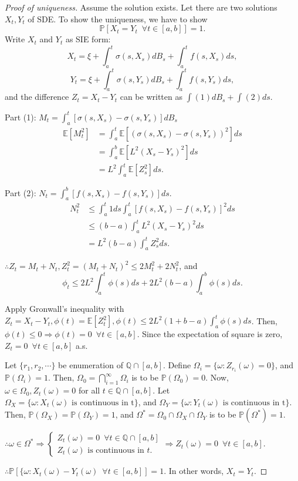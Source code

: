 \documentclass[12pt]{report}
\renewcommand{\P}{\mathbb{P}}
\newcommand{\E}{\mathbb{E}}
\renewcommand{\1}{\mathbb{1}}
\renewcommand{\O}{\Omega}
\theoremstyle{break}
\theoremstyle{newdef}
\theoremstyle{remark}
\begin{document}
\begin{proof}[Proof of uniqueness]
Assume the solution exists.
Let there are two solutions $X_t, Y_t$ of SDE.
To show the uniqueness, we have to show
$$
\P[X_t = Y_t \enspace \forall t\in[a,b]] = 1.
$$
Write $X_t$ and $Y_t$ as SIE form:
$$
X_t = \xi + \int_a^t \sigma(s,X_s)dB_s + \int_a^t f(s,X_s)ds,
$$
$$
Y_t = \xi + \int_a^t \sigma(s,Y_s)dB_s + \int_a^t f(s,Y_s)ds,
$$
and the difference $Z_t = X_t - Y_t$ can be written as $\int (1) dB_s + \int (2)ds$.


Part (1): $M_t = \int_a^t [\sigma(s,X_s) - \sigma(s,Y_s)]dB_s$
\begin{align}
\E[M_t^2] &= \int_a^t \E\left[(\sigma(s,X_s)-\sigma(s,Y_s))^2\right]ds\tag*{}\\
&= \int_a^b \E\left[ L^2(X_s-Y_s)^2 \right]ds\tag{By Lipschitz}\\
&= L^2\int_a^t \E\left[Z_s^2\right]ds.\tag*{}
\end{align}


Part (2): $N_t = \int_a^b \left[f(s,X_s)-f(s,Y_s)\right]ds$.
\begin{align}
N_t^2
&\leq \int_a^t 1ds \int_a^t \left[ f(s,X_s)-f(s,Y_s)\right]^2ds\tag*{}\\
&\leq (b-a) \int_a^t L^2(X_s-Y_s)^2ds\tag{By Lipschitz}\\
&= L^2(b-a)\int_a^t Z_s^2 ds.\tag*{}
\end{align}

$\therefore Z_t = M_t + N_t, Z_t^2 = (M_t + N_t)^2 \leq 2M_t^2 + 2N_t^2$, and
$$\phi_t \leq 2L^2\int_a^t \phi(s)ds + 2L^2(b-a)\int_a^b \phi(s)ds.$$

Apply Gronwall's inequality with $Z_t = X_t - Y_t, \phi(t) = \E[Z_t^2], \phi(t) \leq 2L^2(1+b-a)\int_a^t \phi(s)ds$.
Then, $\phi(t) \leq 0 \Rightarrow \phi(t) = 0 \enspace \forall t\in[a,b]$.
Since the expectation of square is zero, $Z_t = 0 \enspace \forall t \in [a,b]$ a.s.

Let $\{r_1, r_2, \cdots\}$ be enumeration of $\mathbb{Q} \cap [a,b]$.
Define $\O_i = \{ \omega : Z_{r_i}(\omega) = 0\}$, and $\P(\O_i) = 1$.
Then, $\O_0 = \bigcap_{i=1}^\infty \O_i$ is to be $\P(\O_0) = 0$.
Now, $\omega \in \O_0, Z_t(\omega) = 0$ for all $t \in \mathbb{Q} \cap [a,b]$.
Let $\O_X = \{ \omega : X_t(\omega) \text{ is continuous in t}\}$, and
$\O_Y = \{ \omega : Y_t(\omega) \text{ is continuous in t}\}$.
Then, $\P(\O_X) = \P(\O_Y) = 1$, and $\O^* = \O_0 \cap \O_X \cap \O_Y$ is to be $\P(\O^*) = 1$.

$\therefore \omega \in \O^* \Rightarrow
\begin{cases}
Z_t(\omega) = 0 \enspace \forall t \in \mathbb{Q} \cap [a,b]\\
Z_t(\omega) \text{ is continuous in } t.
\end{cases}
\Rightarrow Z_t(\omega) = 0 \enspace \forall t\in[a,b]
$.

$\therefore \P \left[ \{ \omega : X_t(\omega) - Y_t(\omega) \enspace \forall t \in [a,b] \right] = 1$.
In other words, $X_t = Y_t$. %
\end{proof}
\end{document}
